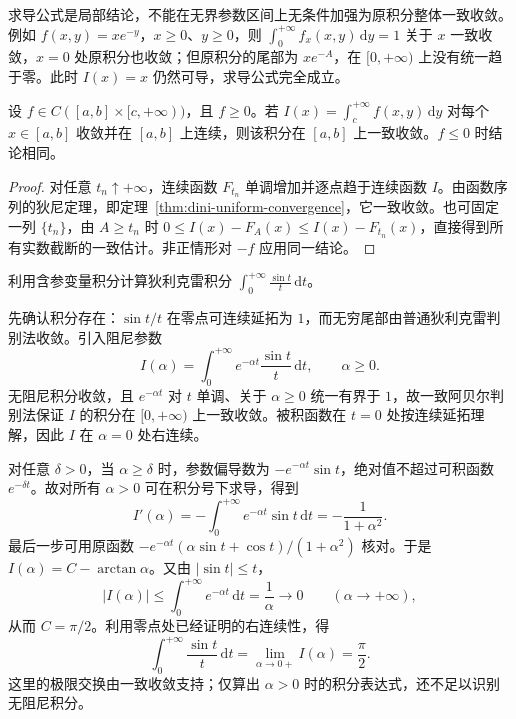 \documentclass[UTF8,12pt,a4paper,fontset=fandol]{ctexbook}
\begin{document}
\begin{remark}
\label{rem:parameter-derivative-unbounded-domain}
求导公式是局部结论，不能在无界参数区间上无条件加强为原积分整体一致收敛。例如 $f(x,y)=xe^{-y}$，$x\geq0$、$y\geq0$，则 $\int_0^{+\infty}f_x(x,y)\,\mathrm{d}y=1$ 关于 $x$ 一致收敛，$x=0$ 处原积分也收敛；但原积分的尾部为 $xe^{-A}$，在 $[0,+\infty)$ 上没有统一趋于零。此时 $I(x)=x$ 仍然可导，求导公式完全成立。
\end{remark}

\begin{proposition}[非负积分的狄尼定理]
\label{prop:parameter-integral-dini}
设 $f\in C([a,b]\times[c,+\infty))$，且 $f\geq0$。若 $I(x)=\int_c^{+\infty}f(x,y)\,\mathrm{d}y$ 对每个 $x\in[a,b]$ 收敛并在 $[a,b]$ 上连续，则该积分在 $[a,b]$ 上一致收敛。$f\leq0$ 时结论相同。
\end{proposition}

\begin{proof}
对任意 $t_n\uparrow+\infty$，连续函数 $F_{t_n}$ 单调增加并逐点趋于连续函数 $I$。由函数序列的狄尼定理，即定理~\ref{thm:dini-uniform-convergence}，它一致收敛。也可固定一列 $\{t_n\}$，由 $A\geq t_n$ 时 $0\leq I(x)-F_A(x)\leq I(x)-F_{t_n}(x)$，直接得到所有实数截断的一致估计。非正情形对 $-f$ 应用同一结论。
\end{proof}

\begin{example}
\label{ex:parameter-dirichlet-integral-evaluation}
利用含参变量积分计算狄利克雷积分 $\displaystyle\int_0^{+\infty}\frac{\sin t}{t}\,\mathrm{d}t$。
\end{example}

\begin{solve}
先确认积分存在：$\sin t/t$ 在零点可连续延拓为 $1$，而无穷尾部由普通狄利克雷判别法收敛。引入阻尼参数
\[
    I(\alpha)=\int_0^{+\infty}e^{-\alpha t}\frac{\sin t}{t}\,\mathrm{d}t,
    \qquad\alpha\geq0.
\]
无阻尼积分收敛，且 $e^{-\alpha t}$ 对 $t$ 单调、关于 $\alpha\geq0$ 统一有界于 $1$，故一致阿贝尔判别法保证 $I$ 的积分在 $[0,+\infty)$ 上一致收敛。被积函数在 $t=0$ 处按连续延拓理解，因此 $I$ 在 $\alpha=0$ 处右连续。

对任意 $\delta>0$，当 $\alpha\geq\delta$ 时，参数偏导数为 $-e^{-\alpha t}\sin t$，绝对值不超过可积函数 $e^{-\delta t}$。故对所有 $\alpha>0$ 可在积分号下求导，得到
\[
    I'(\alpha)=-\int_0^{+\infty}e^{-\alpha t}\sin t\,\mathrm{d}t
    =-\frac1{1+\alpha^2}.
\]
最后一步可用原函数 $-e^{-\alpha t}(\alpha\sin t+\cos t)/(1+\alpha^2)$ 核对。于是 $I(\alpha)=C-\arctan\alpha$。又由 $|\sin t|\leq t$，
\[
    |I(\alpha)|\leq\int_0^{+\infty}e^{-\alpha t}\,\mathrm{d}t
    =\frac1\alpha\longrightarrow0\qquad(\alpha\to+\infty),
\]
从而 $C=\pi/2$。利用零点处已经证明的右连续性，得
\begin{equation}
    \int_0^{+\infty}\frac{\sin t}{t}\,\mathrm{d}t
    =\lim_{\alpha\to0+}I(\alpha)=\frac\pi2.
    \label{eq:parameter-dirichlet-integral-value}
\end{equation}
这里的极限交换由一致收敛支持；仅算出 $\alpha>0$ 时的积分表达式，还不足以识别无阻尼积分。
\end{solve}
\end{document}

